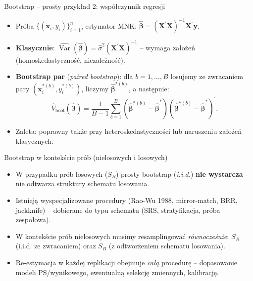 \documentclass[10pt,ignorenonframetext, aspectratio=169]{beamer}
\newcommand{\bX}{\boldsymbol{X}}
\newcommand{\bx}{\boldsymbol{x}}
\newcommand{\by}{\boldsymbol{y}}
\newcommand{\bbeta}{\boldsymbol{\beta}}
\begin{document}
\begin{frame}{Bootstrap -- prosty przykład 2: współczynnik regresji}
\begin{itemize}
\justifying
    \item Próba $\{(\bx_i, y_i)\}_{i=1}^n$, estymator MNK: $\hat{\bbeta} = (\bX^\prime \bX)^{-1} \bX^\prime \by$.
    \item \textbf{Klasycznie}: $\widehat{\operatorname{Var}}(\hat{\bbeta}) = \hat{\sigma}^2 (\bX^\prime \bX)^{-1}$ -- wymaga założeń (homoskedastyczność, niezależność).
    \item \textbf{Bootstrap par} (\emph{paired bootstrap}): dla $b=1,\ldots,B$ losujemy ze zwracaniem pary $(\bx_i^{*(b)}, y_i^{*(b)})$, liczymy $\hat{\bbeta}^{*(b)}$, a następnie:
    \begin{equation*}
        \hat{V}_{\text{boot}}(\hat{\bbeta}) = \frac{1}{B-1}\sum_{b=1}^{B}(\hat{\bbeta}^{*(b)} - \bar{\hat{\bbeta}}^*)(\hat{\bbeta}^{*(b)} - \bar{\hat{\bbeta}}^*)^{\!\prime}.
    \end{equation*}
    \item Zaleta: poprawny także przy heteroskedastyczności lub naruszeniu założeń klasycznych.
\end{itemize}
\end{frame}

\begin{frame}{Bootstrap w kontekście prób (nielosowych i losowych)}
\begin{itemize}
\justifying
    \item W przypadku prób losowych ($S_B$) prosty bootstrap (\emph{i.i.d.}) \textbf{nie wystarcza} -- nie odtwarza struktury schematu losowania.
    \item Istnieją wyspecjalizowane procedury (Rao-Wu 1988, mirror-match, BRR, jackknife) -- dobierane do typu schematu (SRS, stratyfikacja, próba zespołowa).
    \item W kontekście prób nielosowych musimy resamplingować \emph{równocześnie}: $S_A$ (i.i.d. ze zwracaniem) oraz $S_B$ (z odtworzeniem schematu losowania).
    \item Re-estymacja w każdej replikacji obejmuje \emph{całą} procedurę -- dopasowanie modeli PS/wynikowego, ewentualną selekcję zmiennych, kalibrację.
\end{itemize}
\end{frame}
\end{document}
